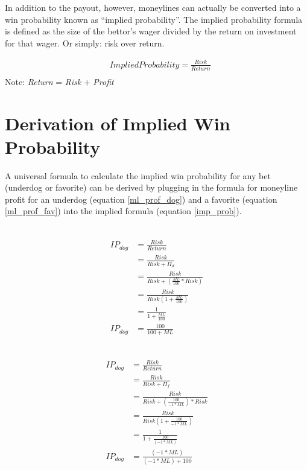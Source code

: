 \documentclass [MS] {uclathes}
\begin{document}
\noindent In addition to the payout, however, moneylines can actually be converted into a win probability known as ``implied probability''. The implied probability formula is defined as the size of the bettor's wager divided by the return on investment for that wager. Or simply: risk over return.

\begin{equation} \label{imp_prob}
\begin{split}
& Implied Probability = \frac{Risk}{Return}  \\
\end{split}
\end{equation}
Note: \emph{Return} = \emph{Risk} + \emph{Profit}

\section{Derivation of Implied Win Probability}
A universal formula to calculate the implied win probability for any bet (underdog or favorite) can be derived by plugging in the formula for moneyline profit for an underdog (equation \ref{ml_prof_dog}) and a favorite (equation \ref{ml_prof_fav}) into the implied formula (equation \ref{imp_prob}).

\noindent {} \\
\begin{equation} \label{ip_dog}
\begin{split}
IP_{dog} & = \frac{Risk}{Return}  \\
& = \frac{Risk}{Risk + \Pi_{d}}  \\
& = \frac{Risk}{Risk + \left( \frac{ML}{100}*Risk \right)} \\ 
& = \frac{Risk}{Risk \left( 1 + \frac{ML}{100}  \right)} \\ 
& = \frac{1}{ 1 + \frac{ML}{100} } \\ 
IP_{dog} & = \frac{100}{100 + ML} 
\end{split}
\end{equation}


\noindent {} \\
\begin{equation} \label{ip_dog}
\begin{split}
IP_{dog} & = \frac{Risk}{Return}  \\
& = \frac{Risk}{Risk + \Pi_{f}}  \\
& = \frac{Risk}{Risk + \left( \frac{100}{-1 * ML} \right) * Risk } \\ 
& = \frac{Risk}{Risk \left( 1 + \frac{100}{-1 * ML}  \right)} \\ 
& = \frac{1}{ 1 + \frac{100}{(-1 * ML)} } \\ 
IP_{dog} & = \frac{(-1 * ML)}{(-1 * ML) + 100} 
\end{split}
\end{equation}
\end{document}
